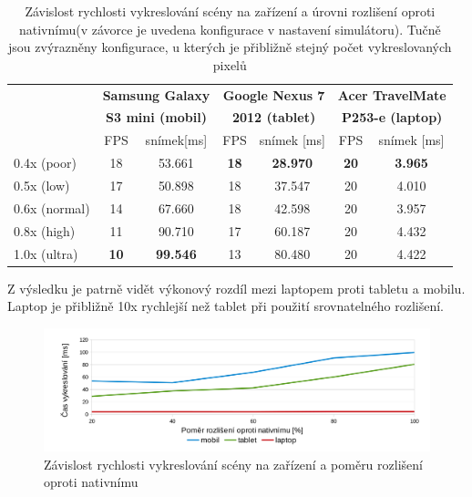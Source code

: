\documentclass[11pt,twoside,a4paper]{book}
\begin{document}
\begin{table}[h!]
\begin{center}
\begin{tabular}{||p{25mm}||c|c||c|c||c|c||}
\hline
& \multicolumn{2}{c||}{\textbf{Samsung Galaxy}}
& \multicolumn{2}{c||}{\textbf{Google Nexus 7}}
& \multicolumn{2}{c||}{\textbf{Acer TravelMate}} \\
& \multicolumn{2}{c||}{\textbf{S3 mini (mobil)}}
& \multicolumn{2}{c||}{\textbf{2012 (tablet)}}
& \multicolumn{2}{c||}{\textbf{P253-e (laptop)}} \\
& FPS & snímek[ms] & FPS & snímek [ms] & FPS & snímek [ms] \\
\hline
0.4x (poor)   & 18 & 53.661 & \textbf{18} & \textbf{28.970} & \textbf{20} & \textbf{3.965} \\ \hline
0.5x (low)    & 17 & 50.898 & 18 & 37.547 & 20 & 4.010 \\ \hline
0.6x (normal) & 14 & 67.660 & 18 & 42.598 & 20 & 3.957 \\ \hline
0.8x (high)   & 11 & 90.710 & 17 & 60.187 & 20 & 4.432 \\ \hline
1.0x (ultra)  & \textbf{10} & \textbf{99.546} & 13 & 80.480 & 20 & 4.422 \\ \hline
\end{tabular}
\caption{Závislost rychlosti vykreslování scény na zařízení a úrovni rozlišení oproti nativnímu(v závorce je uvedena konfigurace v nastavení simulátoru). Tučně jsou zvýrazněny konfigurace, u kterých je přibližně stejný počet vykreslovaných pixelů}
\end{center}
\end{table}

Z výsledku je patrně vidět výkonový rozdíl mezi laptopem proti tabletu a mobilu. Laptop je přibližně 10x rychlejší než tablet při použití srovnatelného rozlišení.

\begin{figure}[h!]
\includegraphics[width=150mm]{figures/graf2.png}
\caption{Závislost rychlosti vykreslování scény na zařízení a poměru rozlišení oproti nativnímu}
\end{figure}
\end{document}
